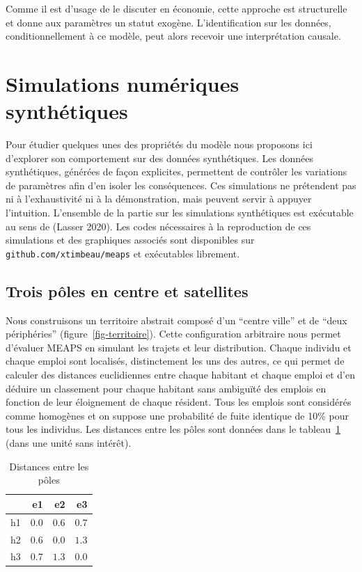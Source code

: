 \documentclass[
  10pt,
  a4paper,
  numbers=noendperiod,
  DIV=12]{scrartcl}
\begin{document}
Comme il est d'usage de le discuter en économie, cette approche est
structurelle et donne aux paramètres un statut exogène. L'identification
sur les données, conditionnellement à ce modèle, peut alors recevoir une
interprétation causale.

\hypertarget{sec-synt}{%
\section{Simulations numériques synthétiques}\label{sec-synt}}

Pour étudier quelques unes des propriétés du modèle nous proposons ici
d'explorer son comportement sur des données synthétiques. Les données
synthétiques, générées de façon explicites, permettent de contrôler les
variations de paramètres afin d'en isoler les conséquences. Ces
simulations ne prétendent pas ni à l'exhaustivité ni à la démonstration,
mais peuvent servir à appuyer l'intuition. L'ensemble de la partie sur
les simulations synthétiques est exécutable au sens de (Lasser 2020).
Les codes nécessaires à la reproduction de ces simulations et des
graphiques associés sont disponibles sur
\texttt{github.com/xtimbeau/meaps} et exécutables librement.

\hypertarget{trois-puxf4les-en-centre-et-satellites}{%
\subsection{Trois pôles en centre et
satellites}\label{trois-puxf4les-en-centre-et-satellites}}

Nous construisons un territoire abstrait composé d'un ``centre ville''
et de ``deux périphéries'' (figure~\ref{fig-territoire}). Cette
configuration arbitraire nous permet d'évaluer MEAPS en simulant les
trajets et leur distribution. Chaque individu et chaque emploi sont
localisés, distinctement les uns des autres, ce qui permet de calculer
des distances euclidiennes entre chaque habitant et chaque emploi et
d'en déduire un classement pour chaque habitant sans ambiguïté des
emplois en fonction de leur éloignement de chaque résident. Tous les
emplois sont considérés comme homogènes et on suppose une probabilité de
fuite identique de 10\% pour tous les individus. Les distances entre les
pôles sont données dans le tableau~\ref{tbl-distances} (dans une unité
sans intérêt).

\hypertarget{tbl-distances}{}
\begin{longtable}{lrrr}
\caption{\label{tbl-distances}Distances entre les pôles }\tabularnewline

\toprule
 & e1 & e2 & e3 \\ 
\midrule
h1 & $0.0$ & $0.6$ & $0.7$ \\ 
h2 & $0.6$ & $0.0$ & $1.3$ \\ 
h3 & $0.7$ & $1.3$ & $0.0$ \\ 
\bottomrule
\end{longtable}
\end{document}
